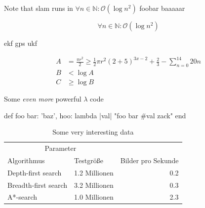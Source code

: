 \documentclass{thesis}
\begin{document}
Note that \gls{slam}  runs\cite{patrick_rothfuss_name_2012} in \( \forall n \in \mathbb{N}: \mathcal{O}(\log n^2) \) foobar\cite{patrick_rothfuss_furcht_2011} baaaaar\cite{patrick_rothfuss_furcht_2012}

\[
\forall n \in \mathbb{N}: \mathcal{O}(\log n^2)
\]

\gls{ekf} \gls{gps} \gls{ukf}

\begin{align}
  A & = \frac{\pi r^2}{2} \geq \frac{1}{2} \pi r^2 (2 + 5)^{3x - 2} + \frac{2}{3} - \sum_{n=0}^{14}{20n}\\
  B & < \log A\\
  C & \geq \log B
\end{align}

\blindtext

\begin{listing}
  \caption{Some \emph{even more} powerful $\lambda$ code}
  \begin{rubycode}
def foo
  { bar: 'baz', hoo: lambda { |val| "foo bar #{val} zack" } }
end
  \end{rubycode}
\end{listing}

\blindtext

\begin{table}
  \caption{Some very interesting data}
  \center
  \begin{tabular}{l l r}
  \toprule
  \multicolumn{2}{c}{Parameter}\\
  \cmidrule{1-2}
  Algorithmus & Testgröße & Bilder pro Sekunde\\
  \midrule
  Depth-first search & 1.2 Millionen & 0.2\\
  \addlinespace
  Breadth-first search & 3.2 Millionen & 0.3\\
  \addlinespace
  A*-search & 1.0 Millionen & 2.3\\
  \bottomrule
  \end{tabular}
\end{table}

\Blinddocument
\end{document}
